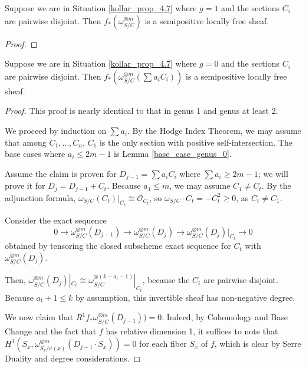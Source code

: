 \begin{lemma}\label{base_case_genus_1}
Suppose we are in Situation \ref{kollar_prop_4.7} where $g=1$ and the sections $C_i$ are pairwise disjoint.
Then $f_{*}(\omega_{S/C}^{\otimes m})$ is a semipositive locally free sheaf.
\end{lemma}
\begin{proof}
\end{proof}

\begin{lemma}\label{inductive_step_genus_0}
Suppose we are in Situation \ref{kollar_prop_4.7} where $g=0$ and the sections $C_i$ are pairwise disjoint.
Then $f_{*}(\omega_{S/C}^{\otimes m}(\sum a_iC_i))$ is a semipositive locally free sheaf.
\end{lemma}
\begin{proof}
This proof is nearly identical to that in genus 1 and genus at least 2.

We proceed by induction on $\sum a_i$.
By the Hodge Index Theorem, we may assume that among $C_1,\ldots,C_n$, $C_1$ is the only section with positive self-intersection.
The base cases where $a_i\le 2m-1$ is Lemma \ref{base_case_genus_0}.

Assume the claim is proven for $D_{j-1}=\sum a_iC_i$ where $\sum a_i\ge 2m-1$; we will prove it for $D_{j}=D_{j-1}+C_t$.
Because $a_{1}\le m$, we may assume $C_1\neq C_t$.
By the adjunction formula, $\omega_{S/C}(C_t)|_{C_t}\cong\mathcal{O}_{C_t}$, so $\omega_{S/C}\cdot C_t=-C_t^2\ge0$, as $C_t\neq C_1$.

Consider the exact sequence
\begin{equation*}\label{exact_seq_of_section_twisted_genus_0}
0\to\omega_{S/C}^{\otimes m}(D_{j-1})\to\omega_{S/C}^{\otimes m}(D_j)\to \omega_{S/C}^{\otimes m}(D_j)|_{C_t}\to0
\end{equation*}
obtained by tensoring the closed subscheme exact sequence for $C_t$ with $\omega_{S/C}^{\otimes m}(D_j)$.

Then, $\omega_{S/C}^{\otimes m}(D_j)|_{C_t}\cong \omega_{S/C}^{\otimes (k-a_{t}-1)}|_{C_t}$, because the $C_i$ are pairwise disjoint.
Because $a_{t}+1\le k$ by assumption, this invertible sheaf has non-negative degree.

We now claim that $R^{1}f_{*}\omega_{S/C}^{\otimes m}(D_{j-1}))=0$.
Indeed, by Cohomology and Base Change and the fact that $f$ has relative dimension 1, it suffices to note that $H^{1}(S_x,\omega_{S_x/\kappa(x)}^{\otimes m}(D_{j-1}\cdot S_x))=0$ for each fiber $S_x$ of $f$, which is clear by Serre Duality and degree considerations.


\end{proof}
